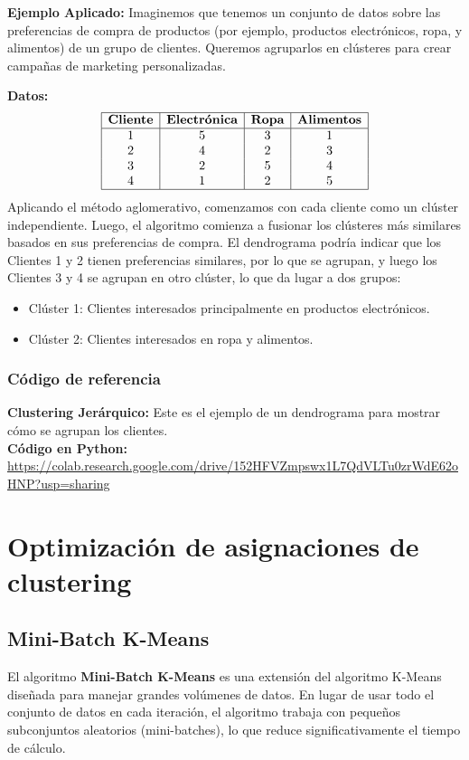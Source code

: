 \documentclass[12pt]{book}
\begin{document}
	\textbf{Ejemplo Aplicado:}
	Imaginemos que tenemos un conjunto de datos sobre las preferencias de compra de productos (por ejemplo, productos electrónicos, ropa, y alimentos) de un grupo de clientes. Queremos agruparlos en clústeres para crear campañas de marketing personalizadas.
	
	\textbf{Datos:}
	\[
	\begin{array}{|c|c|c|c|}
		\hline
		\textbf{Cliente} & \textbf{Electrónica} & \textbf{Ropa} & \textbf{Alimentos} \\
		\hline
		1 & 5 & 3 & 1 \\
		2 & 4 & 2 & 3 \\
		3 & 2 & 5 & 4 \\
		4 & 1 & 2 & 5 \\
		\hline
	\end{array}
	\]
	Aplicando el método aglomerativo, comenzamos con cada cliente como un clúster independiente. Luego, el algoritmo comienza a fusionar los clústeres más similares basados en sus preferencias de compra. El dendrograma podría indicar que los Clientes 1 y 2 tienen preferencias similares, por lo que se agrupan, y luego los Clientes 3 y 4 se agrupan en otro clúster, lo que da lugar a dos grupos:
	\begin{itemize}
		\item Clúster 1: Clientes interesados principalmente en productos electrónicos.
		\item Clúster 2: Clientes interesados en ropa y alimentos.
	\end{itemize}
	\subsubsection*{Código de referencia}
	\textbf{Clustering Jerárquico:} Este es el ejemplo de un dendrograma para mostrar cómo se agrupan los clientes. \\
	\textbf{Código en Python:} \\ \url{https://colab.research.google.com/drive/152HFVZmpswx1L7QdVLTu0zrWdE62oHNP?usp=sharing}
	
	\section{Optimización de asignaciones de clustering}
	
	\subsection{Mini-Batch K-Means}
	El algoritmo \textbf{Mini-Batch K-Means} es una extensión del algoritmo K-Means diseñada para manejar grandes volúmenes de datos. En lugar de usar todo el conjunto de datos en cada iteración, el algoritmo trabaja con pequeños subconjuntos aleatorios (mini-batches), lo que reduce significativamente el tiempo de cálculo.
	
\end{document}
